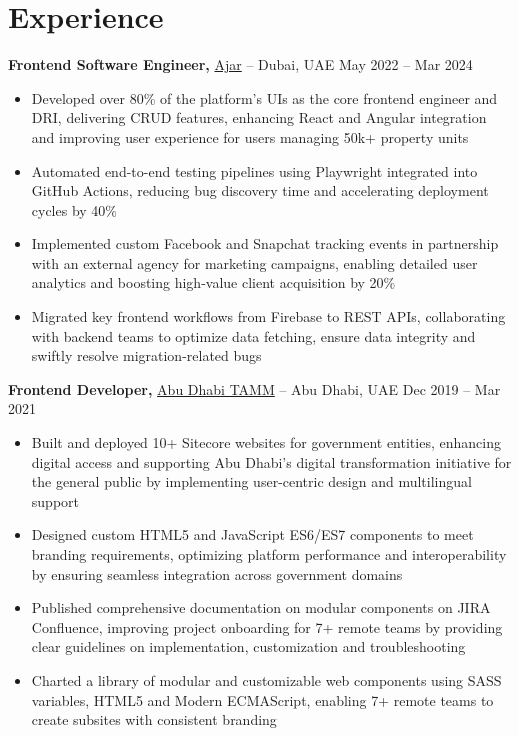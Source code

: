 \documentclass[10pt,letterpaper]{article}
\begin{document}

\section*{Experience}

\textbf{Frontend Software Engineer,} \href{https://joinajar.com/}{Ajar} -- Dubai, UAE \hfill May 2022 -- Mar 2024 \\
\vspace{-5pt}
\begin{itemize}
  \item Developed over 80\% of the platform's UIs as the core frontend engineer and DRI, delivering CRUD features, enhancing React and Angular integration and improving user experience for users managing 50k+ property units
  \item Automated end-to-end testing pipelines using Playwright integrated into GitHub Actions, reducing bug discovery time and accelerating deployment cycles by 40\%
  \item Implemented custom Facebook and Snapchat tracking events in partnership with an external agency for marketing campaigns, enabling detailed user analytics and boosting high-value client acquisition by 20\%
  \item Migrated key frontend workflows from Firebase to REST APIs, collaborating with backend teams to optimize data fetching, ensure data integrity and swiftly resolve migration-related bugs
\end{itemize}


\textbf{Frontend Developer,} \href{https://www.tamm.abudhabi/}{Abu Dhabi TAMM} -- Abu Dhabi, UAE \hfill Dec 2019 -- Mar 2021 \\
\vspace{-5pt}
\begin{itemize}
  \item Built and deployed 10+ Sitecore websites for government entities, enhancing digital access and supporting Abu Dhabi's digital transformation initiative for the general public by implementing user-centric design and multilingual support
  \item Designed custom HTML5 and JavaScript ES6/ES7 components to meet branding requirements, optimizing platform performance and interoperability by ensuring seamless integration across government domains
  \item Published comprehensive documentation on modular components on JIRA Confluence, improving project onboarding for 7+ remote teams by providing clear guidelines on implementation, customization and troubleshooting
  \item Charted a library of modular and customizable web components using SASS variables, HTML5 and Modern ECMAScript, enabling 7+ remote teams to create subsites with consistent branding
\end{itemize}
\end{document}
